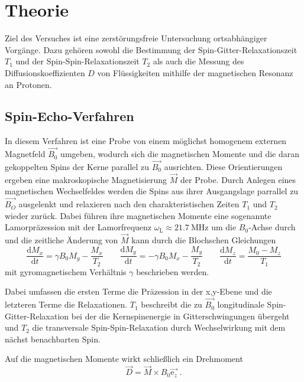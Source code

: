 
\section{Theorie}
\label{sec:Theorie}

Ziel des Versuches ist eine zerstörungsfreie Untersuchung ortsabhängiger Vorgänge. Dazu gehören sowohl die Bestimmung der 
Spin-Gitter-Relaxationszeit $T_1$ und der Spin-Spin-Relaxationszeit $T_2$ als auch die Messung des Diffusionskoeffizienten $D$
von Flüssigkeiten mithilfe der magnetischen Resonanz an Protonen.

\subsection{Spin-Echo-Verfahren}

In diesem Verfahren ist eine Probe von einem möglichst homogenem externen Magnetfeld $\vec{B_0}$ umgeben, wodurch sich die 
magnetischen Momente und die daran gekoppelten Spins der Kerne parallel zu $\vec{B_0}$ ausrichten. 
Diese Orientierungen ergeben eine makroskopische Magnetisierung
$\vec{M}$ der Probe. Durch Anlegen eines magnetischen Wechselfeldes werden die Spins aus ihrer Ausgangslage
parrallel zu $\vec{B_O}$ ausgelenkt und relaxieren nach den charakteristischen Zeiten $T_1$ und $T_2$ wieder zurück.
Dabei führen ihre magnetischen Momente eine sogenannte Lamorpräzession mit der Lamorfrequenz 
$\omega_\text{L} \approx \SI{21.7}{\mega\hertz}$ um die $B_0$-Achse durch und die zeitliche
Änderung von $\vec{M}$ kann durch die Blochschen Gleichungen
\begin{equation}
    \frac{\text{d}M_x}{\text{d}t} = \gamma B_0 M_y - \frac{M_x}{T_2} \qquad 
    \frac{\text{d}M_y}{\text{d}t} = - \gamma B_0 M_x - \frac{M_y}{T_2} \qquad
    \frac{\text{d}M_z}{\text{d}t} = \frac{M_0 - M_z}{T_1}
\end{equation}
mit gyromagnetischem Verhältnis $\gamma$ beschrieben werden.

Dabei umfassen die ersten Terme die Präzession in der x,y-Ebene und die letzteren Terme die Relaxationen.
$T_1$ beschreibt die zu $\vec{B_0}$ longitudinale Spin-Gitter-Relaxation bei der die Kernspinenergie in Gitterschwingungen übergeht
und $T_2$ die transversale Spin-Spin-Relaxation durch Wechselwirkung mit dem nächst benachbarten Spin.

Auf die magnetischen Momente wirkt schließlich ein Drehmoment
\begin{equation}
    \vec{D} = \vec{M} \times B_0 \vec{\text{e}_z} \; .
\end{equation} 

